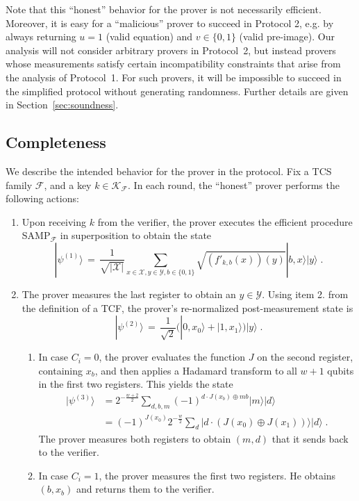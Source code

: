 \documentclass[11pt]{article}
\theoremstyle{remark}
\theoremstyle{definition}
\newcommand{\ket}[1]{|#1\rangle}
\newcommand{\mY}{\ensuremath{\mathcal{Y}}}
\newcommand{\inj}{J}
\newcommand{\sX}{\mathcal{X}}
\newcommand{\sY}{\mathcal{Y}}
\begin{document}
Note that this ``honest'' behavior for the prover is not necessarily efficient. Moreover, it is easy for a ``malicious'' prover to succeed in Protocol 2, e.g. by always returning $u=1$ (valid equation) and $v\in\{0,1\}$ (valid pre-image). Our analysis will not consider arbitrary provers in Protocol~2, but instead provers whose measurements satisfy certain incompatibility constraints that arise from the analysis of Protocol~1. For such provers, it will be impossible to succeed in the simplified protocol without generating randomness. Further details are given in Section~\ref{sec:soundness}.


\subsection{Completeness}
\label{sec:completeness}

We describe the intended behavior for the prover in the protocol. Fix a TCS family $\mathcal{F}$, and a key $k\in\mathcal{K}_\mathcal{F}$. In each round, the ``honest'' prover performs the following actions:
\begin{enumerate}
\item Upon receiving $k$ from the verifier, the prover executes the efficient procedure  SAMP$_{\mathcal{F}}$ in superposition to obtain the state
\[ \ket{\psi^{(1)}}\,=\,    \frac{1}{\sqrt{|\sX|}}\sum_{x\in \sX,y\in \sY,b\in\{0,1\}}\sqrt{(f'_{k,b}(x))(y)}\ket{b,x}\ket{y}\;.\]
\item The prover measures the last register to obtain an $y\in\mY$. Using item 2. from the definition of a TCF, the prover's re-normalized post-measurement state is
\[\ket{\psi^{(2)}} \,=\, \frac{1}{\sqrt{2}}\big(\ket{0,x_0}+\ket{1,x_1}\big)\ket{y}\;.\]
\begin{enumerate}
\item In case $C_i=0$, the prover evaluates the function $\inj$ on the second register, containing $x_b$, and then applies a Hadamard transform to all $w+1$ qubits in the first two registers. This yields the state 
\begin{align*}
\ket{\psi^{(3)}} &= 2^{-\frac{w+2}{2}}  \sum_{d,b,m} (-1)^{d\cdot \inj(x_b)\oplus mb} \ket{m}\ket{d}\\
&= (-1)^{\inj(x_0)} 2^{-\frac{w}{2}}  \sum_{d} \ket{d\cdot (\inj(x_0)\oplus \inj(x_1))}\ket{d}\;.
\end{align*}
The prover measures both registers to obtain $(m,d)$ that it sends back to the verifier. 
\item In case $C_i=1$, the prover measures the first two registers. He obtains $(b,x_b)$ and returns them to the verifier.
\end{enumerate}
\end{enumerate}
\end{document}
